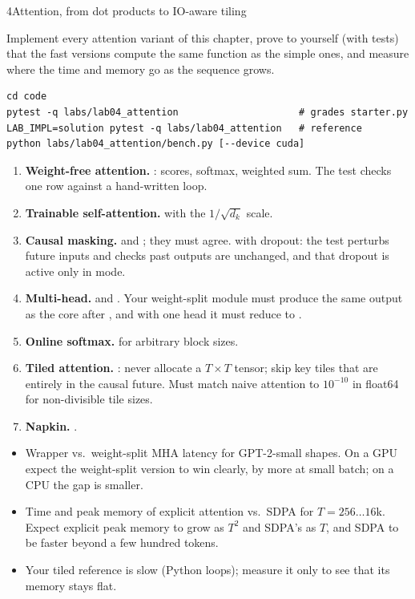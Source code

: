 \begin{labbox}{4}{Attention, from dot products to IO-aware tiling}

Implement every attention variant of this chapter, prove to yourself (with tests) that the
fast versions compute the same function as the simple ones, and measure where the time and memory
go as the sequence grows.

\begin{lstlisting}[style=shell]
cd code
pytest -q labs/lab04_attention                     # grades starter.py
LAB_IMPL=solution pytest -q labs/lab04_attention   # reference
python labs/lab04_attention/bench.py [--device cuda]
\end{lstlisting}

\begin{enumerate}
  \item \textbf{Weight-free attention.} : scores, softmax, weighted sum.
  The test checks one row against a hand-written loop.
  \item \textbf{Trainable self-attention.}  with the $1/\sqrt{d_k}$ scale.
  \item \textbf{Causal masking.}  and ; they must
  agree.  with dropout: the test perturbs future inputs and checks
  past outputs are unchanged, and that dropout is active only in  mode.
  \item \textbf{Multi-head.}  and
  . Your weight-split module must produce the same output as the
  core  after , and with one head it must
  reduce to .
  \item \textbf{Online softmax.}  for arbitrary block sizes.
  \item \textbf{Tiled attention.} : never allocate a $T\times T$ tensor; skip
  key tiles that are entirely in the causal future. Must match naive attention to $10^{-10}$ in
  float64 for non-divisible tile sizes.
  \item \textbf{Napkin.} .
\end{enumerate}

\begin{itemize}
  \item Wrapper vs.\ weight-split MHA latency for GPT-2-small shapes. On a GPU expect the weight-split
  version to win clearly, by more at small batch; on a CPU the gap is smaller.
  \item Time and peak memory of explicit attention vs.\ SDPA for $T=256\ldots16$k. Expect explicit
  peak memory to grow as $T^2$ and SDPA's as $T$, and SDPA to be faster beyond a few hundred tokens.
  \item Your tiled reference is slow (Python loops); measure it only to see that its memory stays flat.
\end{itemize}


\end{labbox}
